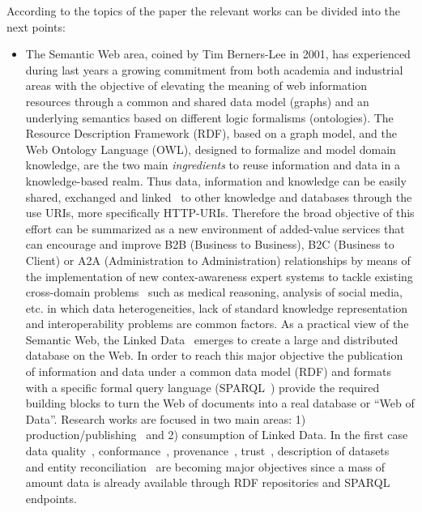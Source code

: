 According to the topics of the paper the relevant works can be divided into the next points:

\begin{itemize}
 \item  The Semantic Web area, coined by Tim Berners-Lee in 2001, has experienced during last years a growing commitment from both academia and industrial areas 
 with the objective of elevating the meaning of web information resources through a common and shared data model (graphs) and 
 an underlying semantics based on different logic formalisms (ontologies). The Resource Description Framework (RDF), based on a graph model, 
 and the Web Ontology Language (OWL), designed to formalize and model domain knowledge, are the two main \textit{ingredients} to reuse information and data 
 in a knowledge-based realm. Thus data, information and knowledge can be easily shared, exchanged and linked~\cite{Maali_Cyganiak_2011} 
 to other knowledge and databases through the use URIs, more specifically HTTP-URIs. Therefore the broad objective of this effort can be summarized 
 as a new environment of added-value services that can encourage and improve B2B (Business to Business), B2C (Business to Client) or 
 A2A (Administration to Administration) relationships by means of the implementation of new contex-awareness expert systems to tackle existing 
 cross-domain problems~\cite{DBLP:journals/cbm/GonzalezA13,DBLP:journals/eswa/Casado-LumbrerasGAP12} such as medical reasoning,
 analysis of social media, etc. in which data heterogeneities, lack of standard knowledge representation 
 and interoperability problems are common factors. As a practical view of the Semantic Web, 
 the Linked Data~\cite{Berners-Lee-2006,Heath_Bizer_2011} emerges to create a large and distributed database on the Web. 
 In order to reach this major objective the publication of information and data under a common data model (RDF) 
 and formats with a specific formal query language (SPARQL~\cite{Sparql11}) provide the required building blocks to turn the Web of documents 
 into a real database or ``Web of Data''. Research works are focused in two main areas: 1) production/publishing~\cite{bizer07how} and 2) consumption of 
 Linked Data. In the first case data quality~\cite{bizer2007,wiqa,ld-quality,DBLP:journals/ws/BizerC09,lodq,link-qa}, conformance~\cite{DBLP:journals/ws/HoganUHCPD12}, 
 provenance~\cite{w3c-prov,DBLP:conf/ipaw/HartigZ10}, trust~\cite{Carroll05namedgraphs}, description of datasets~\cite{void,Cyganiak08semanticsitemaps,ckanValidator} and 
 entity reconciliation~\cite{Serimi,Maali_Cyganiak_2011} are becoming major objectives since a mass of amount data is already available through 
 RDF repositories and SPARQL endpoints. 
 

\end{itemize}
